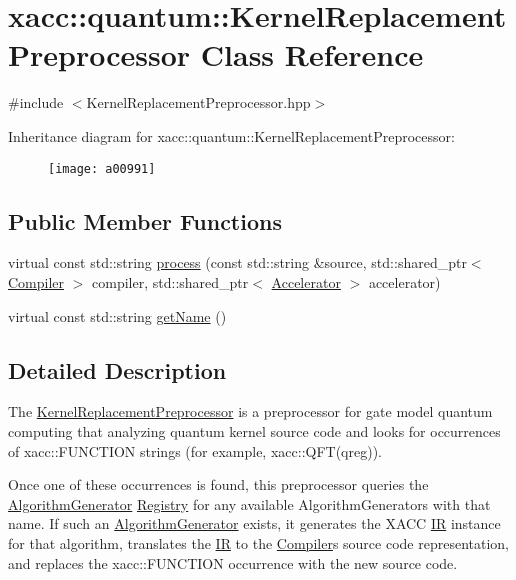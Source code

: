 \hypertarget{a00991}{}\section{xacc\+:\+:quantum\+:\+:Kernel\+Replacement\+Preprocessor Class Reference}
\label{a00991}


{\ttfamily \#include $<$Kernel\+Replacement\+Preprocessor.\+hpp$>$}

Inheritance diagram for xacc\+:\+:quantum\+:\+:Kernel\+Replacement\+Preprocessor\+:\begin{figure}[H]
\begin{center}
\leavevmode
\texttt{[image: a00991]}
\end{center}
\end{figure}
\subsection*{Public Member Functions}
\begin{DoxyCompactItemize}
\item 
virtual const std\+::string \hyperlink{a00991_ad4f9ba1f83ea45ed376f36e3853c668d}{process} (const std\+::string \&source, std\+::shared\+\_\+ptr$<$ \hyperlink{a01127}{Compiler} $>$ compiler, std\+::shared\+\_\+ptr$<$ \hyperlink{a01111}{Accelerator} $>$ accelerator)
\item 
virtual const std\+::string \hyperlink{a00991_af74db6b7f3adeb7d203777f5ce450491}{get\+Name} ()
\end{DoxyCompactItemize}


\subsection{Detailed Description}
The \hyperlink{a00991}{Kernel\+Replacement\+Preprocessor} is a preprocessor for gate model quantum computing that analyzing quantum kernel source code and looks for occurrences of \textquotesingle{}xacc\+::\+F\+U\+N\+C\+T\+I\+ON\textquotesingle{} strings (for example, xacc\+::\+Q\+F\+T(qreg)).

Once one of these occurrences is found, this preprocessor queries the \hyperlink{a01143}{Algorithm\+Generator} \hyperlink{a01223}{Registry} for any available Algorithm\+Generators with that name. If such an \hyperlink{a01143}{Algorithm\+Generator} exists, it generates the X\+A\+CC \hyperlink{a01175}{IR} instance for that algorithm, translates the \hyperlink{a01175}{IR} to the \hyperlink{a01127}{Compiler}\textquotesingle{}s source code representation, and replaces the \textquotesingle{}xacc\+::\+F\+U\+N\+C\+T\+I\+ON\textquotesingle{} occurrence with the new source code. 

